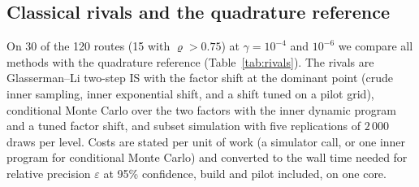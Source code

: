 \documentclass[ijoc,sglanonrev]{informs4}
\begin{document}
\subsection{Classical rivals and the quadrature reference}
\label{sec:baselines}
On 30 of the 120 routes (15 with $\varrho>0.75$) at $\gamma=10^{-4}$ and
$10^{-6}$ we compare all methods with the quadrature reference
(Table~\ref{tab:rivals}). The rivals are Glasserman--Li two-step IS
\citep{GlassermanLi2005} with the factor shift at the dominant point (crude
inner sampling, inner exponential shift, and a shift tuned on a pilot grid),
conditional Monte Carlo over the two factors with the inner dynamic program and
a tuned factor shift, and subset simulation \citep{AuBeck2001} with five
replications of $2\,000$ draws per level. Costs are stated per unit of work
(a simulator call, or one inner program for conditional Monte Carlo) and
converted to the wall time needed for relative precision $\varepsilon$ at 95\%
confidence, build and pilot included, on one core.
\end{document}
